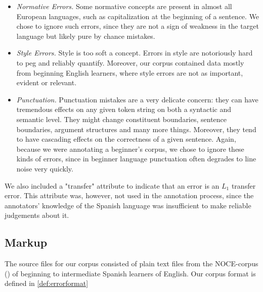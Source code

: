\documentclass[12pt]{article}
\begin{document}
\begin{itemize}
  \item \textit{Normative Errors.} Some normative concepts are present in almost
  all European languages, such as capitalization at the beginning of a sentence.
  We chose to ignore such errors, since they are not a sign of weakness in the
  target language but likely pure by chance mistakes.
  \item \textit{Style Errors.} Style is too soft a concept. Errors in style are
  notoriously hard to peg and reliably quantify. Moreover, our corpus
  contained data mostly from beginning English learners, where style errors are
  not as important, evident or relevant.
  \item \textit{Punctuation.} Punctuation mistakes are a very delicate concern:
  they can have tremendous effects on any given token string on both a syntactic
  and semantic level. They might change constituent boundaries, sentence
  boundaries, argument structures and many more things. Moreover, they tend to
  have cascading effects on the correctness of a given sentence. Again, because
  we were annotating a beginner's corpus, we chose to ignore these kinds of
  errors, since in beginner language punctuation often degrades to line noise
  very quickly.
\end{itemize}

We also included a "transfer" attribute to indicate that an error is an $L_1$
transfer error. This attribute was, however, not used in the annotation process,
since the annotators' knowledge of the Spanish language was insufficient to
make reliable judgements about it.

\subsection{Markup}

The source files for our corpus consisted of plain text files from the
NOCE-corpus (\cite{negrilloph})
of beginning to intermediate Spanish learners of English. Our corpus
format is defined in \ref{def:errorformat}
\end{document}
